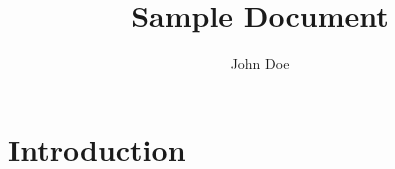 \documentclass[11pt]{article}
\author{John Doe} \title{Sample Document}
\begin{document}
\maketitle

\section{Introduction}


\cite{pd}
\cite{maxmsp}
\cite{vvvv}
\cite{quartzcomposer}
\cite{isadora}
\cite{field}
\cite{wekinator}
\cite{inventing}
\cite{kay}
\cite{sketchpad}
\cite{nls}
\cite{github}
\cite{ror}
\cite{hypercard}
\cite{arduino}
\cite{processing}
\cite{dynamicpictures}
\cite{contextfree}
\cite{logo}
\cite{sicp}
\cite{haskell}
\cite{sussman}
\cite{designeveryday}
\cite{inmates}



\end{document}
